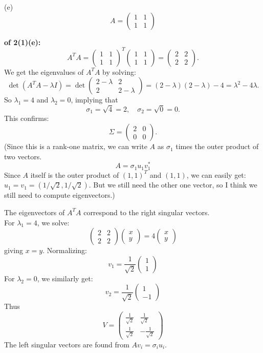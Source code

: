 \documentclass[lang=cn,11pt]{elegantbook}
\begin{document}
(e)
 $$A = \begin{pmatrix}1 & 1\\[3pt]1 & 1\end{pmatrix}$$
 \begin{solution}\textbf{ of 2(1)(e):}\\
\[
A^T A = \begin{pmatrix}1 & 1\\ 1 & 1\end{pmatrix}^T \begin{pmatrix}1 & 1\\ 1 & 1\end{pmatrix} = \begin{pmatrix}2 & 2\\ 2 & 2\end{pmatrix}.
\]
We get the eigenvalues of \( A^T A \)  by solving:
\[
\det(A^T A - \lambda I) = \det \begin{pmatrix}2-\lambda & 2\\ 2 & 2-\lambda\end{pmatrix} = (2-\lambda)(2-\lambda) - 4 = \lambda^2 - 4\lambda.
\]
So \( \lambda_1 = 4 \) and \( \lambda_2 = 0 \), implying that \[
\sigma_1 = \sqrt{4} = 2, \quad \sigma_2 = \sqrt{0} = 0.
\]
This confirms:
\[
\Sigma = \begin{pmatrix}2 & 0\\ 0 & 0\end{pmatrix}.
\]
(Since this is a rank-one matrix, we can write $A$ as $\sigma_1$ times the outer product of two vectors. 
$$
A = \sigma_1 u_1 v_1^*
$$
Since $A$ itself is the outer product of $(1,1)^T$ and $(1,1)$, we can easily get: $u_1 = v_1 = (1/\sqrt{2},1/\sqrt{2})$. But we still need the other one vector, so I think we still need to compute eigenvectors.)

The eigenvectors of \( A^T A \) correspond to the right singular vectors.\\
 For \( \lambda_1 = 4 \), we solve:\[
  \begin{pmatrix}2 & 2\\ 2 & 2\end{pmatrix} \begin{pmatrix}x\\ y\end{pmatrix} = 4 \begin{pmatrix}x\\ y\end{pmatrix}
  \]
giving \( x = y \). Normalizing: \[
  v_1 = \frac{1}{\sqrt{2}} \begin{pmatrix}1\\ 1\end{pmatrix}
  \]
For \( \lambda_2 = 0 \), we similarly get:
  \[
  v_2 = \frac{1}{\sqrt{2}} \begin{pmatrix}1\\ -1\end{pmatrix}
  \]
Thus
  \[
  V = \begin{pmatrix} \frac{1}{\sqrt{2}} & \frac{1}{\sqrt{2}} \\ \frac{1}{\sqrt{2}} & -\frac{1}{\sqrt{2}} \end{pmatrix}
  \]
The left singular vectors are found from \( A v_i = \sigma_i u_i \).\\


\end{solution}
\end{document}
